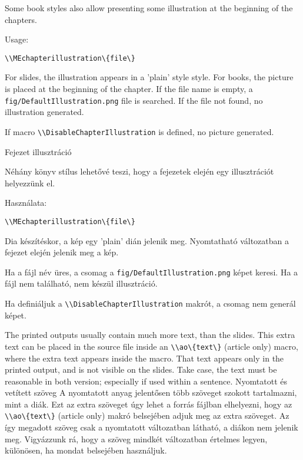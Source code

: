 {
Some book styles also allow presenting some illustration at the beginning of the chapters.
\par Usage:\par
\noindent\lstinline|\\MEchapterillustration\{file\}|

\noindent For slides, the illustration appears in a 'plain' style style.
For books, the picture is placed at the beginning of the chapter.
If the file name is empty, a \lstinline|fig/DefaultIllustration.png| file is searched.
If the file not found, no illustration generated.

If macro \lstinline|\\DisableChapterIllustration| is defined, no picture generated.

}
{Fejezet illusztráció}
{
Néhány könyv stílus lehetővé teszi, hogy a fejezetek elején egy illusztrációt helyezzünk el.
\par Használata:\par
\noindent\lstinline|\\MEchapterillustration\{file\}|

\noindent Dia készítéskor, a kép egy 'plain' dián jelenik meg.
Nyomtatható változatban a fejezet elején jelenik meg a kép.

Ha a fájl név üres, a csomag a \lstinline|fig/DefaultIllustration.png| képet keresi.
Ha a fájl nem található, nem készül illusztráció.

Ha definiáljuk a  \lstinline|\\DisableChapterIllustration|  makrót,
a csomag nem generál képet. 
}


{
The printed outputs usually contain much more text, than the slides.
This extra text can be placed in the source file
inside an \lstinline|\\ao\{text\}| (article only) macro,
where the extra text appears inside the macro.
That text appears only in the printed output, and is not visible on the slides.
Take case, the text must be reasonable in both version;
especially if used within a sentence.
}
{Nyomtatott és vetített szöveg}
{A nyomtatott anyag jelentősen több szöveget szokott tartalmazni, mint
a diák. Ezt az extra szöveget úgy lehet a forrás fájlban elhelyezni,
hogy az \lstinline|\\ao\{text\}| (article only) makró belsejében adjuk meg az extra szöveget.
Az így megadott szöveg csak a nyomtatott változatban látható, 
a diákon nem jelenik meg. 
Vigyázzunk rá, hogy a szöveg mindkét változatban értelmes legyen,
különösen, ha mondat belsejében használjuk.
}


